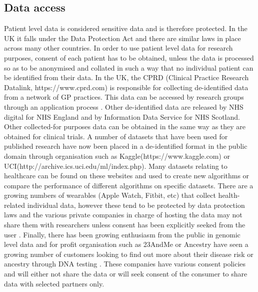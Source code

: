 \subsection{Data access}
Patient level data is considered sensitive data and is therefore protected. In the UK it falls under the Data Protection Act \citep{Government:eUQ8WqXT}  and there are similar laws in place across many other countries.\newline
In order to use patient level data for research purposes, consent of each patient has to be obtained, unless the data is processed so as to be anonymised and collated in such a way that no individual patient can be  identified from their data. In the UK, the CPRD (Clinical Practice Research Datalink, https://www.cprd.com) is responsible for collecting de-identified data from a network of GP practices. This data can be accessed by research groups through an application process \citep{CPRD:VYxcqU74}. Other de-identified data are released by NHS digital for NHS England and by Information Data Service for NHS Scotland.
Other collected-for purposes data can be obtained in the same way as they are obtained for clinical trials. A number of datasets that have been used for published research have now been placed in a de-identified format in the public domain through organisation such as Kaggle(https://www.kaggle.com) or UCI(http://archive.ics.uci.edu/ml/index.php). Many datasets relating to healthcare can be found on these websites and used to create new algorithms or compare the performance of different algorithms on specific datasets.\newline
There are a growing numbers of wearables (Apple Watch, Fitbit, etc) that collect health-related individual data, however these tend to be protected by data protection laws and the various private companies in charge of hosting the data may not share them with researchers unless consent has been explicitly seeked from the user \citep{Apple:nN4TDuuN, Fitbit:FvPrmdk3}. Finally, there has been growing enthusiasm from the public in genomic level data and for profit organisation such as 23AndMe or Ancestry have seen a growing number of customers looking to find out more about their disease risk or ancestry through DNA testing \citep{Regalado:vf}. These companies have various consent policies and will either not share the data or will seek consent of the consumer to share data with selected partners only. 


